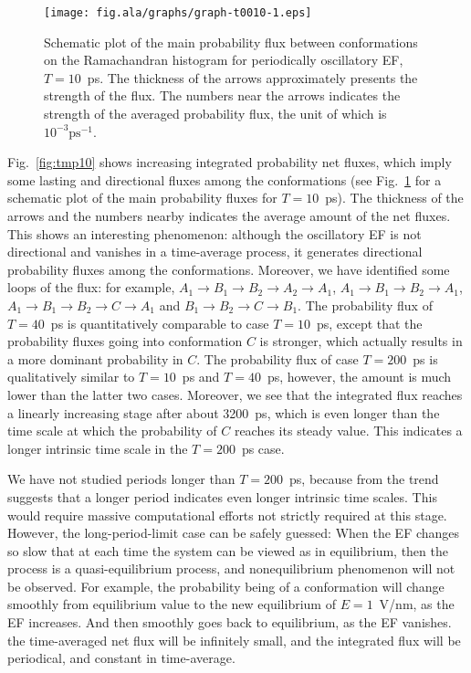 \documentclass[a4paper,preprint,unsortedaddress,onecolumn]{revtex4-1}
\begin{document}
\begin{figure}
  \centering
  \texttt{[image: fig.ala/graphs/graph-t0010-1.eps]}
  \caption{Schematic plot of the main probability flux between conformations
    on the Ramachandran histogram
    for periodically oscillatory EF, $T=10$~ps. The thickness 
    of the arrows approximately presents the strength of the flux.
    The numbers near the arrows indicates the strength of the averaged
    probability flux, the unit of which is $10^{-3}\textrm{ps}^{-1}$.
  }
  \label{fig:tmp11}
\end{figure}
Fig.~\ref{fig:tmp10} shows increasing
integrated probability net fluxes, which imply some lasting and directional
fluxes among the conformations (see Fig.~\ref{fig:tmp11} for a schematic plot of the main probability
fluxes for $T=10$~ps).
The thickness of the arrows and the numbers nearby indicates
the average amount of the net fluxes.
This shows an interesting phenomenon: although
the oscillatory EF is not directional and vanishes in a time-average process,
it generates directional probability fluxes among the conformations.
Moreover, we have identified some loops of the flux: for example, $A_1 \rightarrow B_1
\rightarrow B_2 \rightarrow A_2 \rightarrow A_1$, $A_1 \rightarrow B_1
\rightarrow B_2 \rightarrow A_1$,  $A_1 \rightarrow B_1
\rightarrow B_2 \rightarrow C \rightarrow A_1$ and $B_1
\rightarrow B_2 \rightarrow C \rightarrow B_1$.
The probability flux of $T=40$~ps is quantitatively
comparable to case $T=10$~ps, except that the probability fluxes
going into conformation $C$ is stronger, which actually results in
a more dominant probability in $C$.
The probability flux of case $T=200$~ps is qualitatively
similar to $T=10$~ps and $T=40$~ps, however,
the amount is much lower than the latter two cases.
Moreover, we see that the integrated flux reaches a linearly increasing
stage after about 3200~ps, which is even longer than the time scale
at which the probability of $C$ reaches its steady value. This indicates
a longer intrinsic time scale in the $T=200$~ps case.

We have not studied periods longer than $T=200$~ps, because
from the trend suggests that a longer period indicates even longer intrinsic time scales.
This would require massive computational efforts not strictly required at this stage.
However, the long-period-limit case can be safely guessed: When
the EF changes so slow that at each time the system
can be viewed as in equilibrium, then the process is a quasi-equilibrium
process, and nonequilibrium phenomenon will not be observed. For example,
the probability being of a conformation will change
smoothly from equilibrium value to the new equilibrium of $E=1$~V/nm, as
the EF increases.
And then smoothly goes back to equilibrium, as the EF vanishes.
the time-averaged net flux will be infinitely small,
and the integrated flux will be periodical, and constant in time-average.
\end{document}
